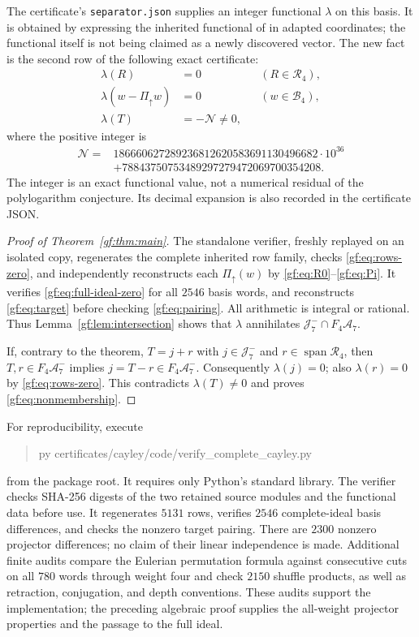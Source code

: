 The certificate's \texttt{separator.json} supplies an integer functional
$\lambda$ on this basis. It is obtained by expressing the inherited
functional of \cite{gf:Bounded} in adapted coordinates; the functional
itself is not being claimed as a newly discovered vector. The new fact
is the second row of the following exact certificate:
\begin{align}
 \lambda(R)&=0 &&(R\in\mathcal R_4),\label{gf:eq:rows-zero}\\
 \lambda(w-\Pi_{\uparrow}w)&=0 &&(w\in\mathcal B_4),
       \label{gf:eq:full-ideal-zero}\\
 \lambda(T)&=-\mathcal N\ne0,\label{gf:eq:pairing}
\end{align}
where the positive integer is
\[
 \begin{aligned}
 \mathcal N={}&186660627289236812620583691130496682\cdot10^{36}\\
              &+78843750753489297279472069700354208.
 \end{aligned}
\]
The integer is an exact functional value, not a numerical residual of the
polylogarithm conjecture. Its decimal expansion is also recorded in the
certificate JSON.

\begin{proof}[Proof of Theorem~\ref{gf:thm:main}]
The standalone verifier, freshly replayed on an isolated copy, regenerates the complete inherited row family,
checks \eqref{gf:eq:rows-zero}, and independently reconstructs each
$\Pi_{\uparrow}(w)$ by \eqref{gf:eq:R0}--\eqref{gf:eq:Pi}. It verifies
\eqref{gf:eq:full-ideal-zero} for all $2546$ basis words, and reconstructs
\eqref{gf:eq:target} before checking \eqref{gf:eq:pairing}. All arithmetic
is integral or rational. Thus Lemma~\ref{gf:lem:intersection} shows that
$\lambda$ annihilates $\mathcal J_7^-\cap F_4\mathcal A_7$.

If, contrary to the theorem, $T=j+r$ with $j\in\mathcal J_7^-$ and
$r\in\operatorname{span}\mathcal R_4$, then $T,r\in F_4\mathcal A_7^-$
implies $j=T-r\in F_4\mathcal A_7^-$. Consequently $\lambda(j)=0$;
also $\lambda(r)=0$ by \eqref{gf:eq:rows-zero}. This contradicts
$\lambda(T)\ne0$ and proves \eqref{gf:eq:nonmembership}.
\end{proof}

For reproducibility, execute
\begin{quote}\ttfamily
py certificates/cayley/code/verify\_complete\_cayley.py
\end{quote}
from the package root. It requires only Python's
standard library. The verifier checks SHA-256 digests of the two retained
source modules and the functional data before use. It regenerates $5131$
rows, verifies $2546$ complete-ideal basis differences, and checks the
nonzero target pairing. There are $2300$ nonzero projector differences;
no claim of their linear independence is made. Additional finite audits
compare the Eulerian permutation formula against consecutive cuts on all
$780$ words through weight four and check $2150$ shuffle products, as
well as retraction, conjugation, and depth conventions. These audits
support the implementation; the preceding algebraic proof supplies the
all-weight projector properties and the passage to the full ideal.

